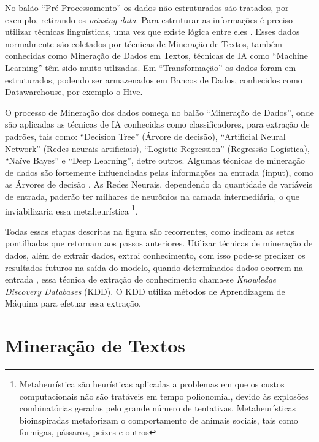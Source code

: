 No balão ``Pré-Processamento'' os dados não-estruturados são tratados, por exemplo, retirando os \textit{missing data}. 
Para estruturar as informações é preciso utilizar técnicas linguísticas, uma vez que existe lógica entre eles \cite{Aranha2006}.
Esses dados normalmente são coletados por técnicas de Mineração de Textos, também conhecidas como Mineração de Dados em Textos, técnicas de IA como ``Machine Learning'' 
têm sido muito utlizadas. Em ``Transformação'' os dados foram em estruturados, podendo ser armazenados em Bancos de Dados, conhecidos como Datawarehouse, por exemplo o Hive. 

O processo de Mineração dos dados começa no balão ``Mineração de Dados'', onde são aplicadas as técnicas de IA conhecidas como classificadores, para extração de padrões, tais como: 
``Decision Tree'' (Árvore de decisão), ``Artificial Neural Network'' (Redes neurais artificiais), ``Logistic Regression'' (Regressão Logística), ``Naïve Bayes'' e ``Deep Learning'', detre outros.
Algumas técnicas de mineração de dados são fortemente influenciadas pelas informações na entrada (input), como as Árvores de decisão \cite{DecisionTree}. 
As Redes Neurais, dependendo da quantidade de variáveis de entrada, paderão ter milhares de neurônios na camada intermediária, o que inviabilizaria essa metaheurística 
\footnote{Metaheurística são heurísticas aplicadas a problemas em que os custos computacionais não são tratáveis em tempo polionomial, devido às explosões combinatórias geradas
pelo grande número de tentativas. Metaheurísticas bioinspiradas metaforizam o comportamento de animais sociais, tais como formigas, pássaros, peixes e outros}.

Todas essas etapas descritas na figura são recorrentes, como indicam as setas pontilhadas que retornam aos passos anteriores.
Utilizar técnicas de mineração de dados, além de extrair dados, extrai conhecimento, com isso pode-se predizer os resultados futuros na saída do modelo, 
quando determinados dados ocorrem na entrada \cite{Amin2015a}, essa técnica de extração de conhecimento chama-se \textit{Knowledge Discovery Databases} (KDD).
O KDD utiliza métodos de Aprendizagem de Máquina para efetuar essa extração.




\section{Mineração de Textos} %

